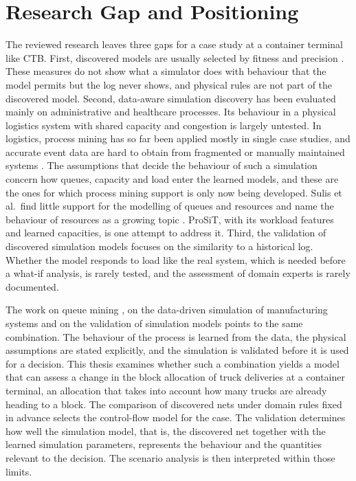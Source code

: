 \section{Research Gap and Positioning}
\label{sec:rw_positioning}

The reviewed research leaves three gaps for a case study at a container terminal
like CTB. First, discovered models are usually selected by fitness and precision
\cite{Buijs2014Quality,DiscoveryBenchmark}. These measures do not show what a
simulator does with behaviour that the model permits but the log never shows, and
physical rules are not part of the discovered model. Second, data-aware simulation
discovery has been evaluated mainly on administrative and healthcare processes.
Its behaviour in a physical logistics system with shared capacity and congestion
is largely untested. In logistics, process mining has so far been applied mostly
in single case studies, and accurate event data are hard to obtain from
fragmented or manually maintained systems \cite{Murazzano2026HealthcareLogistics}.
The assumptions that decide the behaviour of such a simulation concern how
queues, capacity and load enter the learned models, and these are the ones for which
process mining support is only now being developed. Sulis et al.\ find little
support for the modelling of queues and resources and name the behaviour of
resources as a growing topic \cite{Sulis2026SimulationReview}. ProSiT, with its
workload features and learned capacities, is one attempt to address it.
Third, the validation of discovered simulation models focuses on the similarity
to a historical log. Whether the model responds to load like the real system,
which is needed before a what-if analysis, is rarely tested, and the assessment of
domain experts is rarely documented.

The work on queue mining \cite{Senderovich2015QueueMining}, on the data-driven
simulation of manufacturing systems \cite{LugaresiMatta2021} and on the
validation of simulation models \cite{Sargent2013Validation} points to the same
combination. The behaviour of the process is learned from the data, the physical
assumptions are stated explicitly, and the simulation is validated before it is
used for a decision. This thesis examines whether such a combination yields a
model that can assess a change in the block allocation of truck deliveries at a
container terminal, an allocation that takes into account how many trucks
are already heading to a block. The comparison of discovered nets under domain
rules fixed in advance selects the control-flow model for the case.
The validation determines how well the simulation model, that is, the
discovered net together with the learned simulation parameters, represents the
behaviour and the quantities relevant to the decision. The scenario analysis is
then interpreted within those limits.

